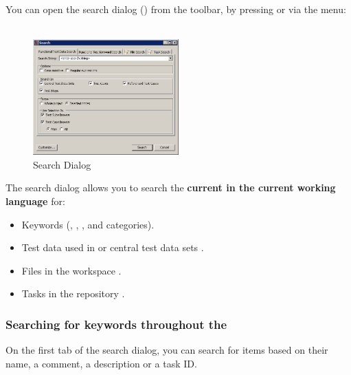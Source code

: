 You can open the search dialog () from the toolbar, by pressing  or via the menu:\\
\\

\begin{figure}[h]
\begin{center}
\includegraphics[width=0.50\textwidth]{Tasks/Searching/PS/SearchDialog}
\caption{Search Dialog}
\label{SearchDialog}
\end{center}
\end{figure}

The search dialog allows you to search the \textbf{current \gdproject{} in the  current working language} for:

\begin{itemize}
\item Keywords  (\gdcases{}, \gdsteps{}, \gdsuites{}, \gdjobs{} and categories).
\item Test data used in \gdcases{} or central test data sets .
\item Files in the workspace .
\item Tasks in the repository .
\end{itemize}


\subsubsection{Searching for keywords throughout the \gdproject{}}
\label{TasksSearchKeywords}

On the first tab of the search dialog, you can search for items based on their name, a comment, a description or a task ID. 

